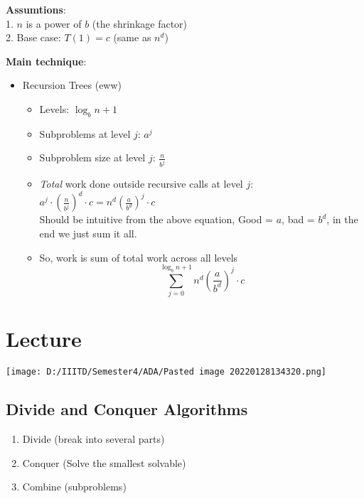 \documentclass[a4paper
]{article}
\providecommand{\tightlist}{%
  \setlength{\itemsep}{0pt}\setlength{\parskip}{0pt}}
\begin{document}
\textbf{Assumtions}:\\
1. {\(n\)} is a power of {\(b\)} (the shrinkage factor)\\
2. Base case: {\(T(1) = c\)} (same as {\(n^{d}\)})

\textbf{Main technique}:

\begin{itemize}
\tightlist
\item
  Recursion Trees (eww)

  \begin{itemize}
  \tightlist
  \item
    Levels: {\(\boxed{\log_{b}n + 1}\)}
  \item
    Subproblems at level {\(j\)}: {\(\boxed{a^{j}}\)}
  \item
    Subproblem size at level {\(j\)}: {\(\boxed{\frac{n}{b^{j}}}\)}
  \item
    \emph{Total} work done outside recursive calls at level {\(j\)}:
    {\(\boxed{a^{j} \cdot \left( \frac{n}{b^{j}} \right)^{d} \cdot c} = n^{d}\left( \frac{a}{b^{d}} \right)^{j} \cdot c\)}\\
    Should be intuitive from the above equation, Good = {\(a\)}, bad =
    {\(b^{d}\)}, in the end we just sum it all.
  \item
    So, work is sum of total work across all
    levels{\[\sum\limits_{j = 0}^{\log_{b}n + 1}n^{d}\left( \frac{a}{b^{d}} \right)^{j} \cdot c\]}
  \end{itemize}
\end{itemize}

\hypertarget{lecture-3}{%
\section{Lecture}\label{lecture-3}}

\texttt{[image: D:/IIITD/Semester4/ADA/Pasted image 20220128134320.png]}

\hypertarget{divide-and-conquer-algorithms}{%
\subsection{Divide and Conquer
Algorithms}\label{divide-and-conquer-algorithms}}

\begin{enumerate}
\tightlist
\item
  Divide (break into several parts)
\item
  Conquer (Solve the smallest solvable)
\item
  Combine (subproblems)
\end{enumerate}
\end{document}

